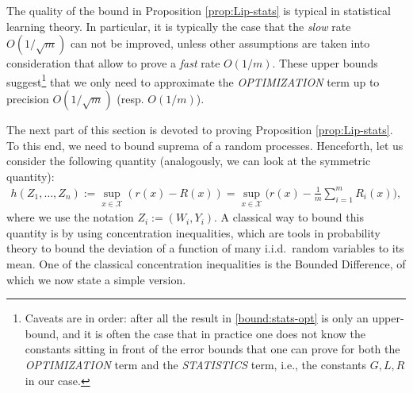 The quality of the bound in Proposition \ref{prop:Lip-stats} is typical in statistical learning theory. In particular, it is typically the case that the \emph{slow} rate $O(1/\sqrt{m})$ can not be improved, unless other assumptions are taken into consideration that allow to prove a \emph{fast} rate $O(1/m)$. These upper bounds suggest\footnote{Caveats are in order: after all the result in \eqref{bound:stats-opt} is only an upper-bound, and it is often the case that in practice one does not know the constants sitting in front of the error bounds that one can prove for both the \emph{OPTIMIZATION} term and the \emph{STATISTICS} term, i.e., the constants $G,L,R$ in our case.} that we only need to approximate the \emph{OPTIMIZATION} term up to precision $O(1/\sqrt{m})$ (resp. $O(1/m)$).

The next part of this section is devoted to proving Proposition \ref{prop:Lip-stats}. To this end, we need to bound suprema of a random processes. Henceforth, let us consider the following quantity (analogously, we can look at the symmetric quantity):
\begin{align}
	h(Z_1,\ldots,Z_n) := \sup_{x\in\mathcal{X}} ( r(x) - R(x) )
	= \sup_{x\in\mathcal{X}} \bigg( r(x)- \frac{1}{m} \sum_{i=1}^m R_i(x) \bigg),
	\label{def:h}
\end{align}
where we use the notation $Z_i := (W_i,Y_i)$. A classical way to bound this quantity is by using concentration inequalities, which are tools in probability theory to bound the deviation of a function of many i.i.d.\ random variables to its mean. One of the classical concentration inequalities is the Bounded Difference, of which we now state a simple version.

